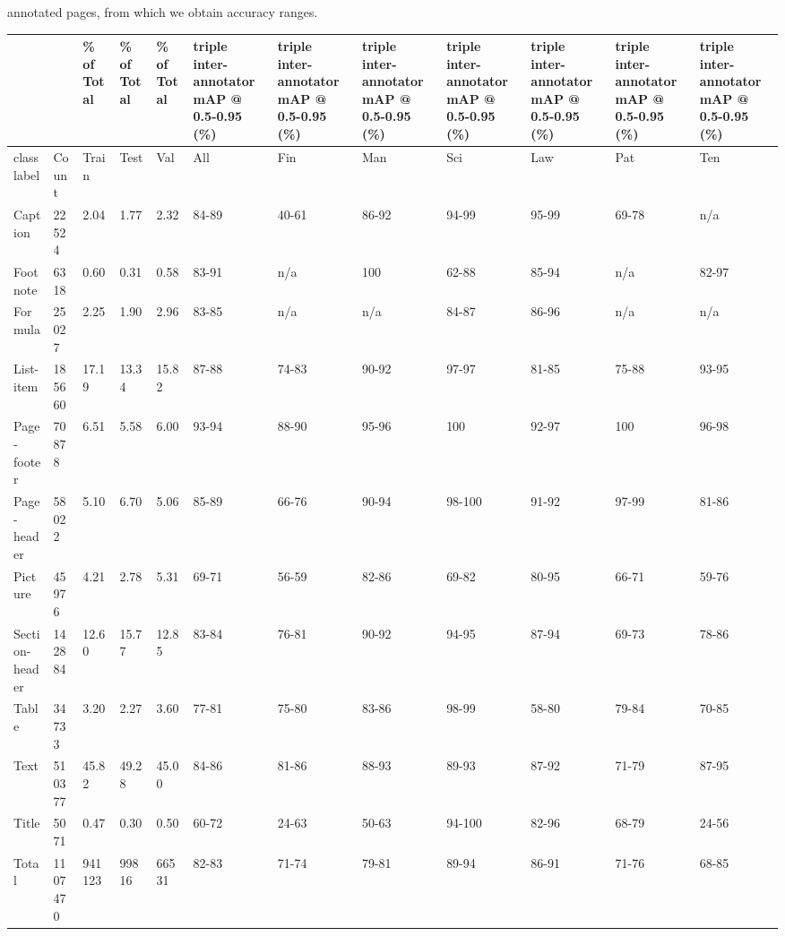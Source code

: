 \documentclass[11pt,a4paper]{article}
\begin{document}
annotated pages, from which we obtain accuracy ranges.

\begin{figure}[h]
\end{figure}

\begin{table}[h]
\begin{tabular}{llllllllllll}
\toprule
 &  & \% of Total & \% of Total & \% of Total & triple inter- annotator mAP @ 0.5-0.95 (\%) & triple inter- annotator mAP @ 0.5-0.95 (\%) & triple inter- annotator mAP @ 0.5-0.95 (\%) & triple inter- annotator mAP @ 0.5-0.95 (\%) & triple inter- annotator mAP @ 0.5-0.95 (\%) & triple inter- annotator mAP @ 0.5-0.95 (\%) & triple inter- annotator mAP @ 0.5-0.95 (\%) \\
\midrule
class label & Count & Train & Test & Val & All & Fin & Man & Sci & Law & Pat & Ten \\
Caption & 22524 & 2.04 & 1.77 & 2.32 & 84-89 & 40-61 & 86-92 & 94-99 & 95-99 & 69-78 & n/a \\
Footnote & 6318 & 0.60 & 0.31 & 0.58 & 83-91 & n/a & 100 & 62-88 & 85-94 & n/a & 82-97 \\
Formula & 25027 & 2.25 & 1.90 & 2.96 & 83-85 & n/a & n/a & 84-87 & 86-96 & n/a & n/a \\
List-item & 185660 & 17.19 & 13.34 & 15.82 & 87-88 & 74-83 & 90-92 & 97-97 & 81-85 & 75-88 & 93-95 \\
Page- footer & 70878 & 6.51 & 5.58 & 6.00 & 93-94 & 88-90 & 95-96 & 100 & 92-97 & 100 & 96-98 \\
Page- header & 58022 & 5.10 & 6.70 & 5.06 & 85-89 & 66-76 & 90-94 & 98-100 & 91-92 & 97-99 & 81-86 \\
Picture & 45976 & 4.21 & 2.78 & 5.31 & 69-71 & 56-59 & 82-86 & 69-82 & 80-95 & 66-71 & 59-76 \\
Section- header & 142884 & 12.60 & 15.77 & 12.85 & 83-84 & 76-81 & 90-92 & 94-95 & 87-94 & 69-73 & 78-86 \\
Table & 34733 & 3.20 & 2.27 & 3.60 & 77-81 & 75-80 & 83-86 & 98-99 & 58-80 & 79-84 & 70-85 \\
Text & 510377 & 45.82 & 49.28 & 45.00 & 84-86 & 81-86 & 88-93 & 89-93 & 87-92 & 71-79 & 87-95 \\
Title & 5071 & 0.47 & 0.30 & 0.50 & 60-72 & 24-63 & 50-63 & 94-100 & 82-96 & 68-79 & 24-56 \\
Total & 1107470 & 941123 & 99816 & 66531 & 82-83 & 71-74 & 79-81 & 89-94 & 86-91 & 71-76 & 68-85 \\
\bottomrule
\end{tabular}
\end{table}
\end{document}

